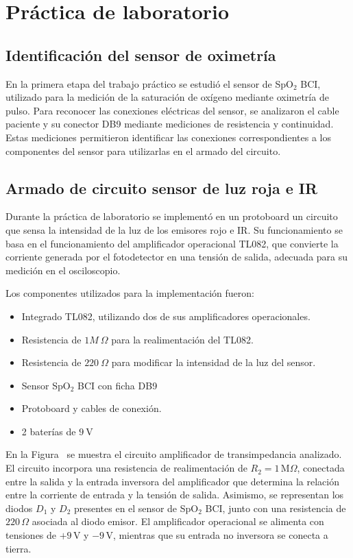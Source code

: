 \section{Práctica de laboratorio}

\subsection{Identificación del sensor de oximetría}
En la primera etapa del trabajo práctico se estudió el sensor de SpO$_2$ BCI, utilizado para la medición de la saturación de oxígeno mediante oximetría de pulso. Para reconocer las conexiones eléctricas del sensor, se analizaron el cable paciente y su conector DB9 mediante mediciones de resistencia y continuidad. Estas mediciones permitieron identificar las conexiones correspondientes a los componentes del sensor para utilizarlas en el armado del circuito. 

\subsection{Armado de circuito sensor de luz roja e IR}

Durante la práctica de laboratorio se implementó en un protoboard un circuito que sensa la intensidad de la luz de los emisores rojo e IR. Su funcionamiento se basa en el funcionamiento del amplificador operacional TL082, que convierte la corriente generada por el fotodetector en una tensión de salida, adecuada para su medición en el osciloscopio. 

Los componentes utilizados para la implementación fueron:

\begin{itemize}
    \item Integrado TL082, utilizando dos de sus amplificadores operacionales.
    \item Resistencia de $1M~\Omega$ para la realimentación del TL082.
    \item Resistencia de $220~\Omega$ para modificar la intensidad de la luz del sensor.
    \item Sensor SpO$_2$ BCI con ficha DB9
    \item Protoboard y cables de conexión.
    \item 2 baterías de $9~\mathrm{V}$
\end{itemize}

En la Figura~ se muestra el circuito amplificador de transimpedancia analizado. El circuito incorpora una resistencia de realimentación de $R_2=1\,\mathrm{M}\Omega$, conectada entre la salida y la entrada inversora del amplificador que determina la relación entre la corriente de entrada y la tensión de salida.
Asimismo, se representan los diodos $D_1$ y $D_2$ presentes en el sensor de SpO$_2$ BCI, junto con una resistencia de $220\,\Omega$ asociada al diodo emisor. El amplificador operacional se alimenta con tensiones de $+9\,\mathrm{V}$ y $-9\,\mathrm{V}$, mientras que su entrada no inversora se conecta a tierra.

